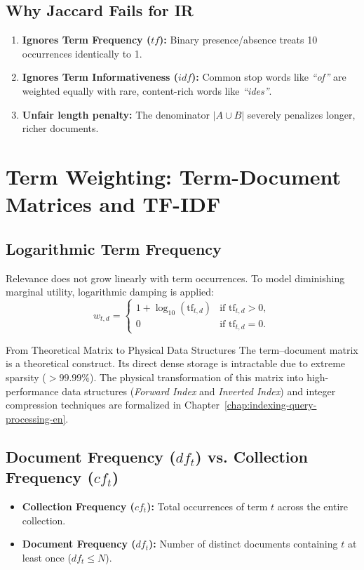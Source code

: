 \subsection{Why Jaccard Fails for IR}
\begin{enumerate}
    \item \textbf{Ignores Term Frequency ($tf$):} Binary presence/absence treats 10 occurrences identically to 1.
    \item \textbf{Ignores Term Informativeness ($idf$):} Common stop words like \textit{``of''} are weighted equally with rare, content-rich words like \textit{``ides''}.
    \item \textbf{Unfair length penalty:} The denominator $|A \cup B|$ severely penalizes longer, richer documents.
\end{enumerate}

\FloatBarrier
\section{Term Weighting: Term-Document Matrices and TF-IDF}
\label{sec:tfidf-weighting-en}

\subsection{Logarithmic Term Frequency}
Relevance does not grow linearly with term occurrences. To model diminishing marginal utility, logarithmic damping is applied:
\begin{equation}
w_{t,d} = \begin{cases} 1 + \log_{10}(\text{tf}_{t,d}) & \text{if } \text{tf}_{t,d} > 0, \\ 0 & \text{if } \text{tf}_{t,d} = 0. \end{cases}
\end{equation}

\begin{noteblock}{From Theoretical Matrix to Physical Data Structures}
The term--document matrix is a theoretical construct. Its direct dense storage is intractable due to extreme sparsity ($> 99.99\%$). The physical transformation of this matrix into high-performance data structures (\textit{Forward Index} and \textit{Inverted Index}) and integer compression techniques are formalized in Chapter~\ref{chap:indexing-query-processing-en}.
\end{noteblock}

\subsection[Document Frequency vs Collection Frequency]{Document Frequency (\texorpdfstring{$df_t$}{df\_t}) vs. Collection Frequency (\texorpdfstring{$cf_t$}{cf\_t})}
\begin{itemize}
    \item \textbf{Collection Frequency ($cf_t$):} Total occurrences of term $t$ across the entire collection.
    \item \textbf{Document Frequency ($df_t$):} Number of distinct documents containing $t$ at least once ($df_t \le N$).
\end{itemize}

